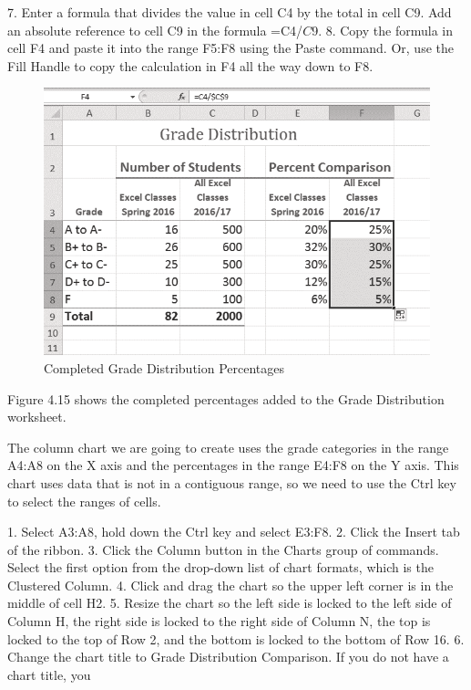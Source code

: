 7. Enter a formula that divides the value in cell C4 by the total in cell C9. Add an absolute reference
to cell C9 in the formula =C4/$C$9.
8. Copy the formula in cell F4 and paste it into the range F5:F8 using the Paste command.
Or, use the Fill Handle to copy the calculation in F4 all the way down to F8.



\begin{figure}[H]
	\centering
	\includegraphics[width=\maxwidth{.95\linewidth}]{gfx/ch04_fig16}
	\caption{Completed Grade Distribution Percentages}
	\label{04:fig16}
\end{figure}




Figure 4.15 shows the completed percentages added to the Grade Distribution worksheet.

The column chart we are going to create uses the grade categories in the range A4:A8 on the X axis
and the percentages in the range E4:F8 on the Y axis. This chart uses data that is not in a contiguous
range, so we need to use the Ctrl key to select the ranges of cells.

1. Select A3:A8, hold down the Ctrl key and select E3:F8.
2. Click the Insert tab of the ribbon.
3. Click the Column button in the Charts group of commands. Select the first option from the
drop-down list of chart formats, which is the Clustered Column.
4. Click and drag the chart so the upper left corner is in the middle of cell H2.
5. Resize the chart so the left side is locked to the left side of Column H, the right side is locked to
the right side of Column N, the top is locked to the top of Row 2, and the bottom is locked to the
bottom of Row 16.
6. Change the chart title to Grade Distribution Comparison. If you do not have a chart title, you



